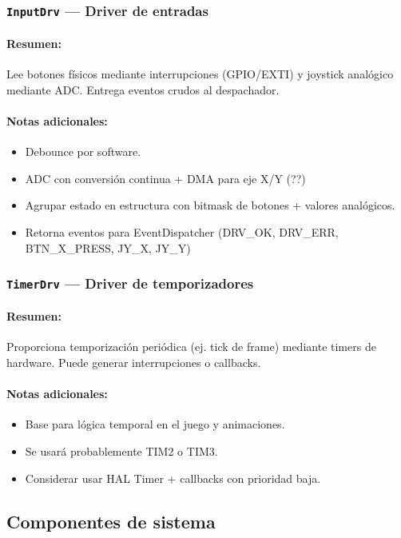 \documentclass[11pt,a4paper]{article}
\begin{document}
\subsubsection{\texttt{InputDrv} — Driver de entradas}
\paragraph{Resumen:} Lee botones físicos mediante interrupciones (GPIO/EXTI) y joystick analógico mediante ADC. Entrega eventos crudos al despachador.
\paragraph{Notas adicionales:}
\begin{itemize}
  \item Debounce por software.
  \item ADC con conversión continua + DMA para eje X/Y (??)
  \item Agrupar estado en estructura con bitmask de botones + valores analógicos.
  \item Retorna eventos para EventDispatcher  (DRV\_OK, DRV\_ERR, BTN\_X\_PRESS, {JY\_X, JY\_Y})
\end{itemize}

\subsubsection{\texttt{TimerDrv} — Driver de temporizadores}
\paragraph{Resumen:} Proporciona temporización periódica (ej. tick de frame) mediante timers de hardware. Puede generar interrupciones o callbacks.
\paragraph{Notas adicionales:}
\begin{itemize}
  \item Base para lógica temporal en el juego y animaciones.
  \item Se usará probablemente TIM2 o TIM3.
  \item Considerar usar HAL Timer + callbacks con prioridad baja.
\end{itemize}

\subsection{Componentes de sistema }
\end{document}
